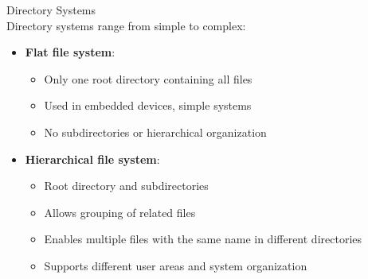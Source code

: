 
\begin{definition}{Directory Systems}\\
    Directory systems range from simple to complex:
    \begin{itemize}
        \item \textbf{Flat file system}:
            \begin{itemize}
                \item Only one root directory containing all files
                \item Used in embedded devices, simple systems
                \item No subdirectories or hierarchical organization
            \end{itemize}
        \item \textbf{Hierarchical file system}:
            \begin{itemize}
                \item Root directory and subdirectories
                \item Allows grouping of related files
                \item Enables multiple files with the same name in different directories
                \item Supports different user areas and system organization
            \end{itemize}
    \end{itemize}
\end{definition}

